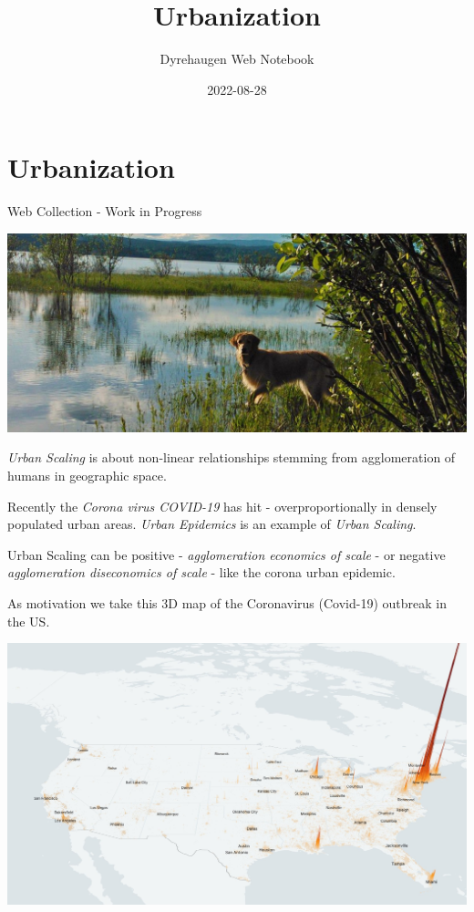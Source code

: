 \documentclass[
]{book}
\title{Urbanization}
\author{Dyrehaugen Web Notebook}
\date{2022-08-28}
\begin{document}
\maketitle

{
\setcounter{tocdepth}{1}
\tableofcontents
}
\hypertarget{urbanization}{%
\chapter{Urbanization}\label{urbanization}}

Web Collection - Work in Progress

\includegraphics{fig/zelda.jpg}

\emph{Urban Scaling} is about non-linear relationships stemming from agglomeration of humans
in geographic space.

Recently the \emph{Corona virus COVID-19} has hit - overproportionally in densely populated urban areas.
\emph{Urban Epidemics} is an example of \emph{Urban Scaling}.

Urban Scaling can be positive - \emph{agglomeration economics of scale} - or negative
\emph{agglomeration diseconomics of scale} - like the corona urban epidemic.

As motivation we take this 3D map of the Coronavirus (Covid-19) outbreak in the US.

\includegraphics{fig/Corona_Cases_pc_US_3D.jpeg}
\end{document}
